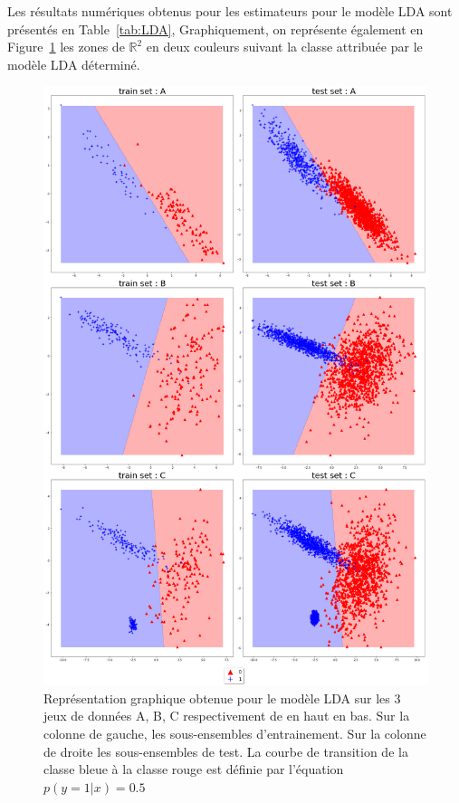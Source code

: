 \documentclass[12pt,a4paper,onecolumn]{article}
\newcommand{\R}{\mathbb{R}} %
\begin{document}
Les résultats numériques obtenus pour les estimateurs pour le modèle LDA sont présentés en Table~\ref{tab:LDA}, Graphiquement, on représente également en Figure~\ref{fig:LDA} les zones de \( \R^2 \) en deux couleurs suivant la classe attribuée par le modèle LDA déterminé.

\begin{figure}[H]
	\centering
	\includegraphics[height = 0.9\textheight]{LDA}
	\caption{Représentation graphique obtenue pour le modèle LDA sur les 3 jeux de données A, B, C respectivement de en haut en bas. Sur la colonne de gauche, les sous-ensembles d'entrainement. Sur la colonne de droite les sous-ensembles de test. La courbe de transition de la classe bleue à la classe rouge est définie par l'équation \( p(y = 1 | x) = 0.5\)}
	\label{fig:LDA}
\end{figure}
\end{document}

